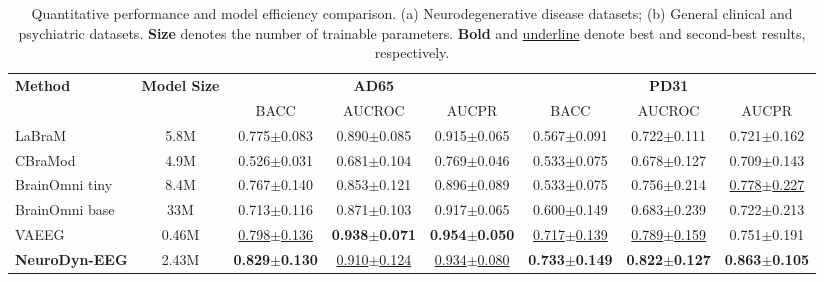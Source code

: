 \documentclass{article}
\begin{document}
{\begin{table}[t]
\caption{Quantitative performance and model efficiency comparison. (a) Neurodegenerative disease datasets; (b) General clinical and psychiatric datasets. \textbf{Size} denotes the number of trainable parameters. \textbf{Bold} and \underline{underline} denote best and second-best results, respectively.}
\label{tab:main_results}
\centering
\small
\setlength{\tabcolsep}{3pt}
\begin{tabular}{l|c|ccc|ccc}
\toprule
\multirow{2}{*}{\textbf{Method}} & \multirow{2}{*}{\textbf{Model Size}} & \multicolumn{3}{c|}{\textbf{AD65}} & \multicolumn{3}{c}{\textbf{PD31}} \\
\cmidrule(lr){3-5} \cmidrule(lr){6-8}
 & & BACC & AUCROC & AUCPR & BACC & AUCROC & AUCPR \\
\midrule
LaBraM         & 5.8M  & 0.775$\pm$0.083 & 0.890$\pm$0.085 & 0.915$\pm$0.065 & 0.567$\pm$0.091 & 0.722$\pm$0.111 & 0.721$\pm$0.162 \\
CBraMod        & 4.9M  & 0.526$\pm$0.031 & 0.681$\pm$0.104 & 0.769$\pm$0.046 & 0.533$\pm$0.075 & 0.678$\pm$0.127 & 0.709$\pm$0.143 \\
BrainOmni tiny & 8.4M  & 0.767$\pm$0.140 & 0.853$\pm$0.121 & 0.896$\pm$0.089 & 0.533$\pm$0.075 & 0.756$\pm$0.214 & \underline{0.778$\pm$0.227} \\
BrainOmni base & 33M   & 0.713$\pm$0.116 & 0.871$\pm$0.103 & 0.917$\pm$0.065 & 0.600$\pm$0.149 & 0.683$\pm$0.239 & 0.722$\pm$0.213 \\
VAEEG          & 0.46M & \underline{0.798$\pm$0.136} & \textbf{0.938$\pm$0.071} & \textbf{0.954$\pm$0.050} & \underline{0.717$\pm$0.139} & \underline{0.789$\pm$0.159} & 0.751$\pm$0.191 \\
\midrule
\textbf{NeuroDyn-EEG} & 2.43M & \textbf{0.829$\pm$0.130} & \underline{0.910$\pm$0.124} & \underline{0.934$\pm$0.080} & \textbf{0.733$\pm$0.149} & \textbf{0.822$\pm$0.127} & \textbf{0.863$\pm$0.105} \\
\bottomrule
\end{tabular}

\vspace{1.5em} 


\end{table}}
\end{document}
